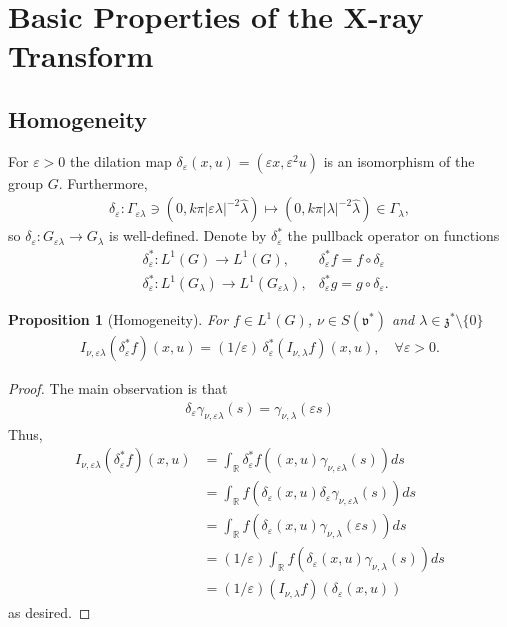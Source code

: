 \documentclass[11pt]{amsart}
\theoremstyle{plain}
\newtheorem{proposition}[theorem]{Proposition}
\theoremstyle{definition}
\theoremstyle{remark}
\numberwithin{equation}{section}
\def\fz{\mathfrak{z}}
\def\fv{\mathfrak{v}}
\def\eps{\varepsilon}
\def\R{{\mathbb R}}%
\numberwithin{equation}{section}
\begin{document}
\section{Basic Properties of the X-ray Transform}\label{s:properties}
\subsection{Homogeneity}

For $\eps>0$ the dilation map $\delta_\eps(x, u)=(\eps x, \eps^2 u)$ is an isomorphism of the group $G$. Furthermore, 
\begin{align*}
	\delta_\eps: \Gamma_{\eps\lambda}\ni (0, k\pi|\eps\lambda|^{-2}\hat{\lambda})\longmapsto (0, k\pi |\lambda|^{-2}\hat{\lambda})\in \Gamma_{\lambda}, 
\end{align*}
so $\delta_\eps: G_{\eps\lambda}\to G_{\lambda}$ is well-defined. Denote by $\delta_\eps^*$ the pullback operator on functions
\begin{align*}
	&\delta_\eps^*: L^1(G)\to L^1(G), & \delta_\eps^*f=f\circ \delta_\eps\\
	&\delta_\eps^*: L^1(G_{\lambda})\to L^1(G_{\eps\lambda}), & \delta_\eps^*g=g\circ\delta_\eps.
\end{align*}
\begin{proposition}[Homogeneity]\label{homogeneity} For $f\in L^1(G)$, $\nu\in S(\fv^*)$ and $\lambda\in \fz^*\setminus\{0\}$
	\begin{align*}
		I_{\nu, \eps\lambda}(\delta_\eps^* f)(x, u)=(1/\eps)\,\delta_\eps^*\left(I_{\nu, \lambda}f\right)(x, u), \quad \forall \eps>0.
	\end{align*}
\end{proposition}
\begin{proof}
	The main observation is that
\begin{align*}
	\delta_\eps \gamma_{\nu, \eps\lambda}(s)=\gamma_{\nu, \lambda}(\eps s)
\end{align*}
Thus,
\begin{align*}
	I_{\nu, \eps\lambda}(\delta_\eps^* f)(x, u)
	&=\int_\R \delta_\eps^*f((x, u)\gamma_{\nu, \eps\lambda}(s))ds\\
	&=\int_\R f(\delta_\eps(x, u)\delta_\eps\gamma_{\nu, \eps\lambda}(s))ds\\
	&=\int_\R f(\delta_\eps (x, u)\gamma_{\nu, \lambda}(\eps s))ds\\
	&=(1/\eps)\int_\R f(\delta_\eps(x, u)\gamma_{\nu ,\lambda}(s))ds\\
	&=(1/\eps)(I_{\nu, \lambda} f)(\delta_\eps(x, u))
\end{align*}
as desired.
\end{proof}
\end{document}
